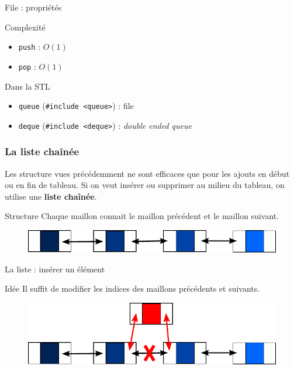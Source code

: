 \begin{frame}{File : propriétés}
\begin{block}{Complexité}
\begin{itemize}
  \item \texttt{push} : $O(1)$
  \item \texttt{pop} : $O(1)$
\end{itemize}
\end{block}

\begin{exampleblock}{Dans la STL}
  \begin{itemize}
  \item \texttt{queue} (\texttt{\#include <queue>}) : file
  \item \texttt{deque} (\texttt{\#include <deque>}) : \textit{double ended queue}
  \end{itemize}
\end{exampleblock}

\end{frame}


\begin{frame}
\frametitle{La liste chaînée}
Les structure vues précédemment ne sont efficaces que pour les ajouts en début ou en fin de tableau. Si on veut insérer ou supprimer au milieu du tableau, on utilise une \textbf{liste chaînée}.

\begin{block}{Structure}
Chaque maillon connait le maillon précédent et le maillon suivant.
\end{block}

\begin{figure}
\centering
\includegraphics[width=0.9 \linewidth]{./images/liste01.pdf}
\end{figure}
\end{frame}

\begin{frame}{La liste : insérer un élément}
\begin{block}{Idée}
Il suffit de modifier les indices des maillons précédents et suivants.
\end{block}

\begin{figure}
\centering
\includegraphics[width=0.9 \linewidth]{./images/liste02.pdf}
\end{figure}
\end{frame}

